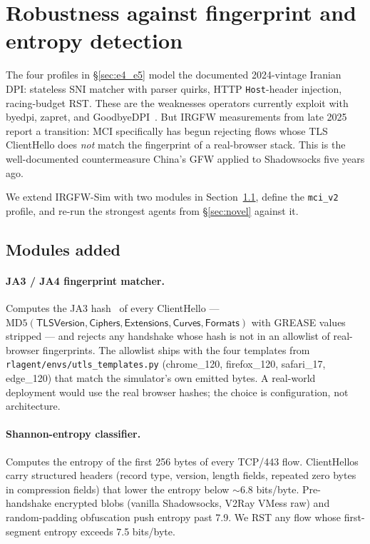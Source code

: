 \documentclass[letterpaper,twocolumn,10pt]{article}
\begin{document}
\section{Robustness against fingerprint and entropy detection}
\label{sec:fpr}

The four profiles in §\ref{sec:e4_e5} model the documented
2024-vintage Iranian DPI: stateless SNI matcher with parser quirks,
HTTP \texttt{Host}-header injection, racing-budget RST. These are the
weaknesses operators currently exploit with byedpi, zapret, and
GoodbyeDPI~\cite{net4people182}. But IRGFW measurements from late
2025~\cite{aryapour2025,xtls2778} report a transition: MCI
specifically has begun rejecting flows whose TLS ClientHello does
\emph{not} match the fingerprint of a real-browser stack. This is
the well-documented countermeasure China's GFW applied to
Shadowsocks five years ago.

We extend IRGFW-Sim with two modules in
Section~\ref{sec:fpr:modules}, define the \texttt{mci\_v2} profile,
and re-run the strongest agents from §\ref{sec:novel} against it.

\subsection{Modules added}
\label{sec:fpr:modules}

\paragraph{JA3 / JA4 fingerprint matcher.} Computes the JA3
hash~\cite{ja3} of every ClientHello —
$\mathrm{MD5}(\textsf{TLSVersion},\textsf{Ciphers},\textsf{Extensions},\textsf{Curves},\textsf{Formats})$
with GREASE values stripped — and rejects any handshake whose hash
is not in an allowlist of real-browser fingerprints. The allowlist
ships with the four templates from
\texttt{rlagent/envs/utls\_templates.py} (chrome\_120, firefox\_120,
safari\_17, edge\_120) that match the simulator's own emitted bytes.
A real-world deployment would use the real browser hashes; the
choice is configuration, not architecture.

\paragraph{Shannon-entropy classifier.} Computes the entropy of the
first 256 bytes of every TCP/443 flow. ClientHellos carry
structured headers (record type, version, length fields, repeated
zero bytes in compression fields) that lower the entropy below
$\sim$6.8 bits/byte. Pre-handshake encrypted blobs (vanilla
Shadowsocks, V2Ray VMess raw) and random-padding obfuscation push
entropy past 7.9. We RST any flow whose first-segment entropy
exceeds 7.5 bits/byte.
\end{document}
